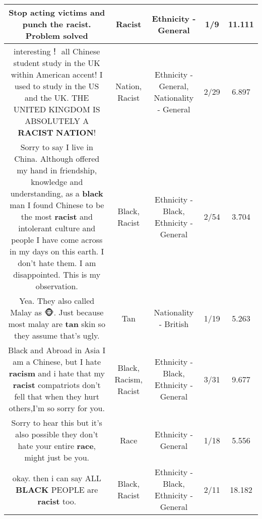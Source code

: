 \documentclass[11pt]{article}
\newlength\mylength
\begin{document}
\begin{center}
\begin{longtable}{|C{.65\mylength}|C{.30\mylength}|C{.12\mylength}|C{.12\mylength}|C{.12\mylength}|}
  \small Stop acting victims and punch the \textbf{racist}. Problem solved\normalsize   & Racist & Ethnicity - General & 1/9 & 11.111 \\  \hline
  \small interesting！ all Chinese student study in the UK within American accent!  I used to study in the US and the UK. THE UNITED KINGDOM IS ABSOLUTELY A \textbf{RACIST} \textbf{NATION}!\normalsize   & Nation, Racist & Ethnicity - General, Nationality - General & 2/29 & 6.897 \\  \hline
  \small Sorry to say I live in China. Although offered my hand in friendship, knowledge and understanding, as a \textbf{black} man I found Chinese to be the most \textbf{racist} and intolerant culture and people I have come across in my days on this earth. I don't hate them. I am disappointed. This is my observation.\normalsize   & Black, Racist & Ethnicity - Black, Ethnicity - General & 2/54 & 3.704 \\  \hline
  \small Yea. They also called Malay as 🐵.  Just because most malay are \textbf{tan} skin so they assume that's ugly.\normalsize   & Tan & Nationality - British & 1/19 & 5.263 \\  \hline
  \small Black and Abroad in Asia I am a Chinese, but I hate \textbf{racism} and i hate that my \textbf{racist} compatriots don't fell that when they hurt others,I'm so sorry for you.\normalsize   & Black, Racism, Racist & Ethnicity - Black, Ethnicity - General & 3/31 & 9.677 \\  \hline
  \small Sorry to hear this but it's also possible they don't hate your entire \textbf{race}, might just be you.\normalsize   & Race & Ethnicity - General & 1/18 & 5.556 \\  \hline
  \small okay. then i can say ALL \textbf{BLACK} PEOPLE are \textbf{racist} too.\normalsize   & Black, Racist & Ethnicity - Black, Ethnicity - General & 2/11 & 18.182 \\  \hline

\end{longtable}
\end{center}
\end{document}
